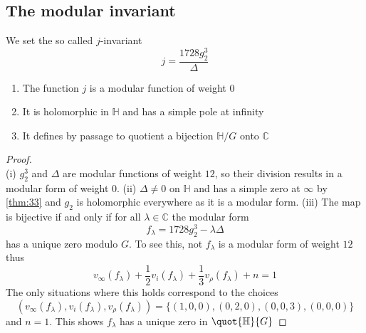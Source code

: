 \documentclass[12pt]{article}
\theoremstyle{definition}
\begin{document}
\subsection{The modular invariant}
We set the so called \(j\)-invariant
\[
    j=\frac{1728g_2^3}{\Delta}
\]
\begin{prop}[label=35]
\begin{enumerate}
    \item The function \(j\) is a modular function of weight \(0\)
    \item It is holomorphic in \(\mathbb{H}\) and has a simple pole at infinity
    \item It defines by passage to quotient a bijection \(\mathbb{H}/G\) onto \(\mathbb{C} \)   
\end{enumerate}
\end{prop}
\begin{proof}~\\
(i) \(g_2^3\) and \(\Delta \) are modular functions of weight \(12\), so their division results in a modular form of weight \(0\).\newline    
(ii) \(\Delta \ne 0\) on \(\mathbb{H} \) and has a simple zero at \(\infty \) by \cref{thm:33} and \(g_2\) is holomorphic everywhere as it is a modular form.\newline
(iii) The map is bijective if and only if for all \(\lambda \in \mathbb{C} \) the modular form 
\[
    f_\lambda =1728g_2^{3}-\lambda \Delta  
\]     
has a unique zero modulo \(G\). To see this, not \(f_\lambda \) is a modular form of weight \(12\) thus 
\[
    v_\infty (f_\lambda ) + \frac{1}{2}v_i(f_\lambda ) +\frac{1}{3}v_\rho (f_\lambda )+n = 1
\]  
The only situations where this holds correspond to the choices
\[
    (v_\infty (f_\lambda ),v_i(f_\lambda ),v_\rho (f_\lambda ))=\{ (1,0,0),(0,2,0),(0,0,3),(0,0,0) \} 
\]
and \(n=1\). This shows \(f_\lambda \) has a unique zero in \(\quot{\mathbb{H} }{G} \)  
\end{proof}
\end{document}
